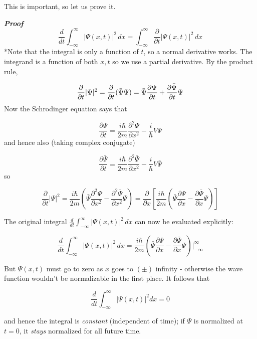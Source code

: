 \documentclass[svgnames]{article}   	%
\begin{document}
This is important, so let us prove it. 


\vspace{20px}
\noindent\textbf{\textit{Proof}} 
  \[
  \frac{d}{dt} \int_{-\infty}^{\infty}  |\Psi(x,t)|^2 \, dx
  = \int_{-\infty}^{\infty}  \frac{\partial}{\partial t} |\Psi(x,t)|^2 \, dx  
  \] 
 *Note that the integral is only a function of $t$, so a normal derivative
 works. The integrand is a function of both $x,t$ so we use a partial
 derivative. 
 \vspace{5px}
 By the product rule, 

 \[
 \frac{\partial}{\partial t} |\Psi|^2 = \frac{\partial}{\partial t}(\bar\Psi
 \Psi) = \bar\Psi \frac{\partial \Psi}{\partial t} + \frac{\partial
 \bar\Psi}{\partial t}\Psi
 \vspace{5px}
 \]
 Now the Schrodinger equation says that 

 \[
 \frac{\partial \Psi}{\partial t} = \frac{i \hbar}{2m}\frac{\partial^2
 \Psi}{\partial x^2} - \frac{i}{\hbar}V\Psi
 \]
 \vspace{5px}
 and hence also (taking complex conjugate)

 \[
   \frac{\partial \bar\Psi}{\partial t} = \frac{i\hbar}{2m} \frac{\partial^2
  \bar\Psi}{\partial x^2} - \frac{i}{\hbar}V\bar\Psi  
 \]
 \vspace{5px}
 so 

 \vspace{5px} \[
 \frac{\partial }{\partial t} |\Psi|^2 = \frac{i\hbar}{2m}\left(\bar\Psi
   \frac{\partial^2 \Psi}{\partial x^2} - \frac{\partial^2 \bar\Psi}{\partial
   x^2} \Psi \right) = \frac{\partial }{\partial x}
   \left[\frac{i\hbar}{2m}\left(\bar\Psi \frac{\partial \Psi}{\partial x}
   - \frac{\partial \bar\Psi}{\partial x} \Psi \right)\right]
 \] \vspace{5px}
 
  \noindent The original integral $\frac{d}{dt} \int_{-\infty}^{\infty} |\Psi(x,t)|^2\,dx
 $ can now be evaluated explicitly: 

\vspace{5px} \[
  \frac{d }{d t} \int_{-\infty}^{\infty}  |\Psi(x,t)|^2 \, dx
  = \frac{i\hbar}{2m} \left(\bar\Psi \frac{\partial \Psi}{\partial x}
  - \frac{\partial \bar\Psi}{\partial x} \Psi \right) \Big|_{-\infty}^{\infty} 
\] \vspace{5px}


\noindent But $\Psi(x,t)$ must go to zero as $x$ goes to $(\pm)$ infinity - otherwise the
wave function wouldn't be normalizable in the first place. It follows that 

\vspace{5px} \[
\frac{d }{d t} \int_{-\infty}^{\infty}  |\Psi(x,t)|^2 dx = 0 
\] \vspace{5px}

\noindent and hence the integral is \textit{constant} (independent of time); if $\Psi$ is
normalized at $t=0$, it \textit{stays} normalized for all future time. 
  
\end{document}
